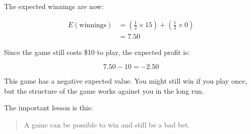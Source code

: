 \documentclass[
  letterpaper,
  DIV=11,
  numbers=noendperiod]{scrreprt}
\begin{document}
The expected winnings are now:

\[
\begin{aligned}
E(\text{winnings})
&=
\left(\frac{1}{2}\times 15\right)
+
\left(\frac{1}{2}\times 0\right) \\
&= 7.50
\end{aligned}
\]

Since the game still costs \$10 to play, the expected profit is:

\[
7.50 - 10 = -2.50
\]

This game has a negative expected value. You might still win if you play
once, but the structure of the game works against you in the long run.

The important lesson is this:

\begin{quote}
A game can be possible to win and still be a bad bet.
\end{quote}
\end{document}
